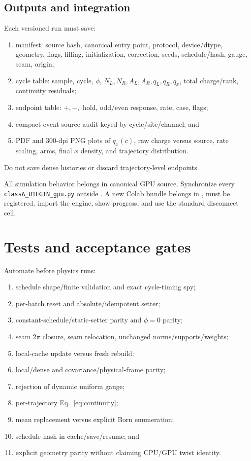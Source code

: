 \documentclass[aps,prb,onecolumn,nofootinbib,superscriptaddress]{revtex4-2}
\newcommand{\code}[1]{\texttt{#1}}
\begin{document}
\subsection{Outputs and integration}

Each versioned run must save:
\begin{enumerate}
 \item manifest: source hash, canonical entry point, protocol, device/dtype,
 geometry, flags, filling, initialization, correction, seeds, schedule/hash,
 gauge, seam, origin;
 \item cycle table: sample, cycle, $\phi$, $N_L,N_R,A_L,A_R,q_L,q_R,q_x$,
 total charge/rank, continuity residuals;
 \item endpoint table: $+,-,$ hold, odd/even response, rate, case, flags;
 \item compact event-source audit keyed by cycle/site/channel; and
 \item PDF and 300-dpi PNG plots of $q_x(c)$, raw charge versus source, rate
 scaling, arms, final $x$ density, and trajectory distribution.
\end{enumerate}
Do not save dense histories or discard trajectory-level endpoints.

All simulation behavior belongs in canonical GPU source.  Synchronize every
\code{classA\_U1FGTN\_gpu.py} outside .  A new
Colab bundle belongs in
, must be registered,
import the engine, show progress, and use the standard disconnect cell.

\section{Tests and acceptance gates}
\label{sec:tests}

Automate before physics runs:
\begin{enumerate}
 \item schedule shape/finite validation and exact cycle-timing spy;
 \item per-batch reset and absolute/idempotent setter;
 \item constant-schedule/static-setter parity and $\phi=0$ parity;
 \item seam $2\pi$ closure, seam relocation, unchanged norms/supports/weights;
 \item local-cache update versus fresh rebuild;
 \item local/dense and covariance/physical-frame parity;
 \item rejection of dynamic uniform gauge;
 \item per-trajectory Eq.~\eqref{eq:continuity};
 \item mean replacement versus explicit Born enumeration;
 \item schedule hash in cache/save/resume; and
 \item explicit geometry parity without claiming CPU/GPU twist identity.
\end{enumerate}
\end{document}
